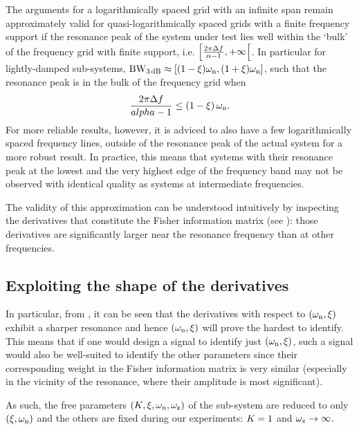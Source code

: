   The arguments for a logarithmically spaced grid with an infinite span remain approximately valid for quasi-logarithmically spaced grids with a finite frequency support if the resonance peak of the system under test lies well within the `bulk' of the frequency grid with finite support, i.e. $\left[ \frac{2\pi \Delta f}{\alpha - 1}, +\infty \right[$.
  In particular for lightly-damped sub-systems, $\mathrm{BW}_{3\,\mathrm{dB}} \approx \left[ (1-\xi_{})\omega_{\mathrm{n}}, (1+\xi_{})\omega_{\mathrm{n}} \right]$, such that the resonance peak is in the bulk of the frequency grid when
  \begin{equation} 
    \frac{2 \pi \Delta f}{alpha -1} \leq \left( 1 - \xi_{} \right) \omega_{\mathrm{n}}
    \text{.}
    \label{eq:excitation:systemInBulk:generic}
  \end{equation}
  For more reliable results, however, it is adviced to also have a few logarithmically spaced frequency lines, outside of the resonance peak of the actual system for a more robust result.
  In practice, this means that systems with their resonance peak at the lowest and the very highest edge of the frequency band may not be observed with identical quality as systems at intermediate frequencies.

  The validity of this approximation can be understood intuitively by inspecting the derivatives that constitute the Fisher information matrix (see ): those derivatives are significantly larger near the resonance frequency than at other frequencies.

  \subsection{Exploiting the shape of the derivatives}
   In particular, from , it can be seen that the derivatives with respect to $(\omega_{\mathrm{n}}, \xi_{})$ exhibit a sharper resonance and hence $(\omega_{\mathrm{n}}, \xi_{})$ will prove the hardest to identify.
   This means that if one would design a signal to identify just $(\omega_{\mathrm{n}}, \xi_{})$, such a signal would also be well-suited to identify the other parameters since their corresponding weight in the Fisher information matrix is very similar (especially in the vicinity of the resonance, where their amplitude is most significant).

   As such, the free parameters $(K_{}, \xi_{}, \omega_{\mathrm{n}}, \omega_{\mathrm{z}})$ of the sub-system are reduced to only $(\xi_{}, \omega_{\mathrm{n}})$ and the others are fixed during our experiments: $K_{} = 1$ and $\omega_{\mathrm{z}} \to \infty$.

